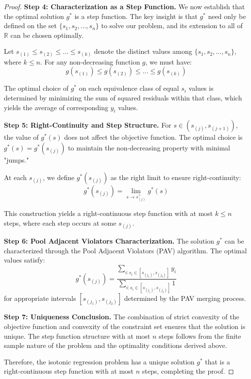 \documentclass[10pt,a4paper]{amsart}
\begin{document}
\begin{proof}
\textbf{Step 4: Characterization as a Step Function.}
We now establish that the optimal solution $g^*$ is a step function. The key insight is that $g^*$ need only be defined on the set $\{s_1, s_2, \ldots, s_n\}$ to solve our problem, and its extension to all of $\mathbb{R}$ can be chosen optimally.

Let $s_{(1)} \leq s_{(2)} \leq \ldots \leq s_{(k)}$ denote the distinct values among $\{s_1, s_2, \ldots, s_n\}$, where $k \leq n$. For any non-decreasing function $g$, we must have:
$$g(s_{(1)}) \leq g(s_{(2)}) \leq \ldots \leq g(s_{(k)})$$

The optimal choice of $g^*$ on each equivalence class of equal $s_i$ values is determined by minimizing the sum of squared residuals within that class, which yields the average of corresponding $y_i$ values.

\textbf{Step 5: Right-Continuity and Step Structure.}
For $s \in (s_{(j)}, s_{(j+1)})$, the value of $g^*(s)$ does not affect the objective function. The optimal choice is $g^*(s) = g^*(s_{(j)})$ to maintain the non-decreasing property with minimal "jumps."

At each $s_{(j)}$, we define $g^*(s_{(j)})$ as the right limit to ensure right-continuity:
$$g^*(s_{(j)}) = \lim_{s \to s_{(j)}^+} g^*(s)$$

This construction yields a right-continuous step function with at most $k \leq n$ steps, where each step occurs at some $s_{(j)}$.

\textbf{Step 6: Pool Adjacent Violators Characterization.}
The solution $g^*$ can be characterized through the Pool Adjacent Violators (PAV) algorithm. The optimal values satisfy:
$$g^*(s_{(j)}) = \frac{\sum_{i: s_i \in [s_{(j_1)}, s_{(j_2)}]} y_i}{\sum_{i: s_i \in [s_{(j_1)}, s_{(j_2)}]} 1}$$
for appropriate intervals $[s_{(j_1)}, s_{(j_2)}]$ determined by the PAV merging process.

\textbf{Step 7: Uniqueness Conclusion.}
The combination of strict convexity of the objective function and convexity of the constraint set ensures that the solution is unique. The step function structure with at most $n$ steps follows from the finite sample nature of the problem and the optimality conditions derived above.

Therefore, the isotonic regression problem has a unique solution $g^*$ that is a right-continuous step function with at most $n$ steps, completing the proof.
\end{proof}
\end{document}
